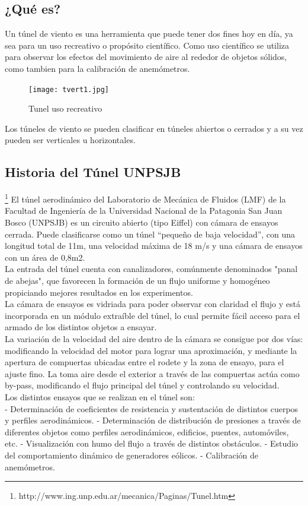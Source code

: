 \subsection{¿Qué es?}
Un túnel de viento es una herramienta que puede tener dos fines hoy en día, ya sea para un uso recreativo o propósito científico.
Como uso científico se utiliza para observar los efectos del movimiento de aire al rededor de objetos sólidos, como tambien para la calibración de anemómetros.
\begin{figure}[htb]
	\centering
	\texttt{[image: tvert1.jpg]}
	\caption{Tunel uso recreativo}
	\label{fig:tunelRec}
	\end{figure}
Los túneles de viento se pueden clasificar en túneles abiertos o cerrados y a su vez pueden ser verticales u horizontales.

\subsection{Historia del Túnel UNPSJB}
\footnote{http://www.ing.unp.edu.ar/mecanica/Paginas/Tunel.htm} 
	El túnel aerodinámico del Laboratorio de Mecánica de Fluidos (LMF) de la Facultad de Ingeniería de la Universidad Nacional de la Patagonia San Juan Bosco (UNPSJB) es un circuito abierto (tipo Eiffel) con cámara de ensayos cerrada. Puede clasificarse como un túnel “pequeño de baja velocidad”, con una longitud total de 11m, una velocidad máxima de 18 m/s y una cámara de ensayos con un área de 0,8m2.
	\\
	La entrada del túnel cuenta con canalizadores, comúnmente denominados "panal de abejas", que favorecen la formación de un flujo uniforme y homogéneo propiciando mejores resultados en los experimentos.
	\\
	La cámara de ensayos es vidriada para poder observar con claridad el flujo y está incorporada en un módulo extraíble del túnel, lo cual permite fácil acceso para el armado de los distintos objetos a ensayar.
	\\
	La variación de la velocidad del aire dentro de la cámara se consigue por dos vías: modificando la velocidad del motor para lograr una aproximación, y mediante la apertura de compuertas ubicadas entre el rodete y la zona de ensayo, para el ajuste fino. La toma aire desde el exterior a través de las compuertas actúa como by-pass, modificando el flujo principal del túnel y controlando su velocidad.
	\\
	Los distintos ensayos que se realizan en el túnel son:
	\\
	- Determinación de coeficientes de resistencia y sustentación de distintos cuerpos y perfiles aerodinámicos.
	- Determinación de distribución de presiones a través de diferentes objetos como perfiles aerodinámicos, edificios, puentes, automóviles, etc.
	- Visualización con humo del flujo a través de distintos obstáculos.
	- Estudio del comportamiento dinámico de generadores eólicos.
	- Calibración de anemómetros. 

